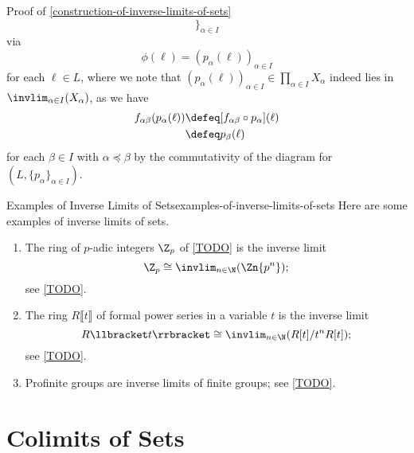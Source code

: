 \begin{Proof}{Proof of \cref{construction-of-inverse-limits-of-sets}}
\[        \}_{\alpha\in I}%
    \]%
    via
    \[
        \phi(\ell)%
        =%
        (p_{\alpha}(\ell))_{\alpha\in I}
    \]%
    for each $\ell\in L$, where we note that $(p_{\alpha}(\ell))_{\alpha\in I}\in\prod_{\alpha\in I}X_{\alpha}$ indeed lies in $\invlim_{\alpha\in I}(X_{\alpha})$, as we have
    \begin{align*}
        f_{\alpha\beta}(p_{\alpha}(\ell)) &\defeq [f_{\alpha\beta}\circ p_{\alpha}](\ell)\\
                                          &\defeq p_{\beta}(\ell)
    \end{align*}
    for each $\beta\in I$ with $\alpha\preceq\beta$ by the commutativity of the diagram for $(L,\{p_{\alpha}\}_{\alpha\in I})$.
\end{Proof}
\begin{example}{Examples of Inverse Limits of Sets}{examples-of-inverse-limits-of-sets}%
    Here are some examples of inverse limits of sets.
    \begin{enumerate}
        \item\label{examples-of-inverse-limits-of-sets-the-p-adic-integers}The ring of $p$-adic integers $\Z_{p}$ of \cref{TODO} is the inverse limit
            \[
                \Z_{p}%
                \cong%
                \invlim_{n\in\N}(\Zn{p^{n}});%
            \]%
            see \cref{TODO}.
        \item\label{examples-of-inverse-limits-of-sets-rings-of-formal-power-series}The ring $R\llbracket t\rrbracket$ of formal power series in a variable $t$ is the inverse limit
            \[
                R\llbracket t\rrbracket%
                \cong%
                \invlim_{n\in\N}(R[t]/t^{n}R[t]);%
            \]%
            see \cref{TODO}.
        \item\label{examples-of-inverse-limits-of-sets-profinite-groups}Profinite groups are inverse limits of finite groups; see \cref{TODO}.
    \end{enumerate}
\end{example}
\section{Colimits of Sets}\label{section-colimits-of-sets}
